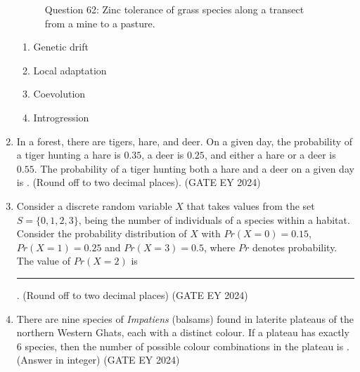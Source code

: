 \begin{enumerate}
\begin{figure}[!ht]
    \caption{Question 62: Zinc tolerance of grass species along a transect from a mine to a pasture.}
    \label{Q.62}
\end{figure}
    \begin{multicols}{2}
    \begin{enumerate}
        \item Genetic drift
        \item Local adaptation
        \item Coevolution
        \item Introgression
    \end{enumerate}
    \end{multicols}
\item In a forest, there are tigers, hare, and deer. On a given day, the probability of a tiger hunting a hare is $0.35$, a deer is $0.25$, and either a hare or a deer is $0.55$. The probability of a tiger hunting both a hare and a deer on a given day is \underline{\hspace{3cm}}. (Round off to two decimal places).
\hfill{(GATE EY 2024)}
\item Consider a discrete random variable $X$ that takes values from the set $S = \{0, 1, 2, 3\}$, being the number of individuals of a species within a habitat. Consider the probability distribution of $X$ with $Pr(X = 0) = 0.15$, $Pr(X = 1) = 0.25$ and $Pr(X = 3) = 0.5$, where $Pr$ denotes probability. The value of $Pr(X = 2)$ is \rule{3cm}{0.15mm}. (Round off to two decimal places)
\hfill{(GATE EY 2024)}
\item There are nine species of \textit{Impatiens} (balsams) found in laterite plateaus of the northern Western Ghats, each with a distinct colour. If a plateau has exactly $6$ species, then the number of possible colour combinations in the plateau is \underline{\hspace{3cm}}. (Answer in integer)
\hfill{(GATE EY 2024)}

\end{enumerate}

\bigskip
{}
